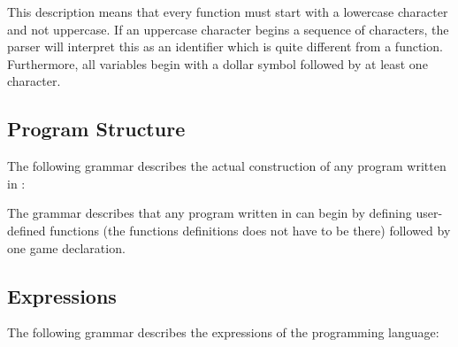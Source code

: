 This description means that every function must start with a lowercase character and not uppercase. If an uppercase character begins a sequence of characters, the parser will interpret this as an identifier which is quite different from a function. Furthermore, all variables begin with a dollar symbol followed by at least one character.

\subsection{Program Structure}
The following grammar describes the actual construction of any program written in \productname{}:

\begin{ebnf}
\end{ebnf}

The grammar describes that any program written in \productname{} can begin by defining user-defined functions (the functions definitions does not have to be there) followed by one game declaration. 

\subsection{Expressions}
The following grammar describes the expressions of the programming language:

\begin{ebnf}
\end{ebnf}

